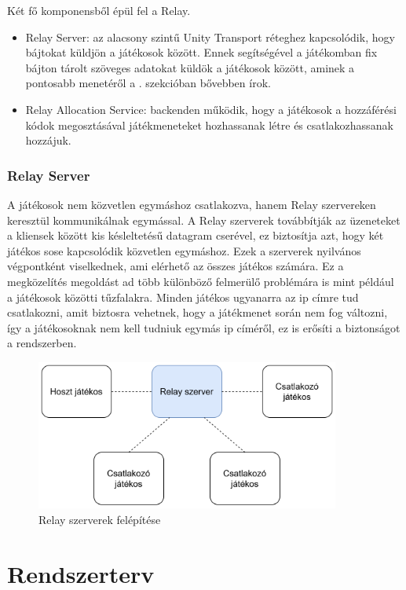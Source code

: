 \documentclass[]{thesis-ekf}
\theoremstyle{definition}
\theoremstyle{remark}
\begin{document}
Két fő komponensből épül fel a Relay.

\begin{itemize}
	\item Relay Server: az alacsony szintű Unity Transport réteghez kapcsolódik, hogy bájtokat küldjön a játékosok között. Ennek segítségével a játékomban fix bájton tárolt szöveges adatokat küldök a játékosok között, aminek a pontosabb menetéről a . szekcióban bővebben írok.
	\item Relay Allocation Service: backenden működik, hogy a játékosok a hozzáférési kódok megosztásával játékmeneteket hozhassanak létre és csatlakozhassanak hozzájuk. \cite{UnityAllocationsService}
\end{itemize}

\subsection{Relay Server}

A játékosok nem közvetlen egymáshoz csatlakozva, hanem Relay szervereken keresztül kommunikálnak egymással. A Relay szerverek továbbítják az üzeneteket a kliensek között kis késleltetésű datagram cserével, ez biztosítja azt, hogy két játékos sose kapcsolódik közvetlen egymáshoz. Ezek a szerverek nyilvános végpontként viselkednek, ami elérhető az összes játékos számára. Ez a megközelítés megoldást ad több különböző felmerülő problémára is mint például a játékosok közötti tűzfalakra. Minden játékos ugyanarra az ip címre tud csatlakozni, amit biztosra vehetnek, hogy a játékmenet során nem fog változni, így a játékosoknak nem kell tudniuk egymás ip címéről, ez is erősíti a biztonságot a rendszerben. \cite{UnityRelayServers}

\begin{figure}[ht!]
	\centering
	\includegraphics[width=10cm]{RelayServer}
	\caption{Relay szerverek felépítése}
	\label{fig-unityrelayservers}
\end{figure}

\chapter{Rendszerterv}
\label{ch-rendszerterv}
\end{document}

